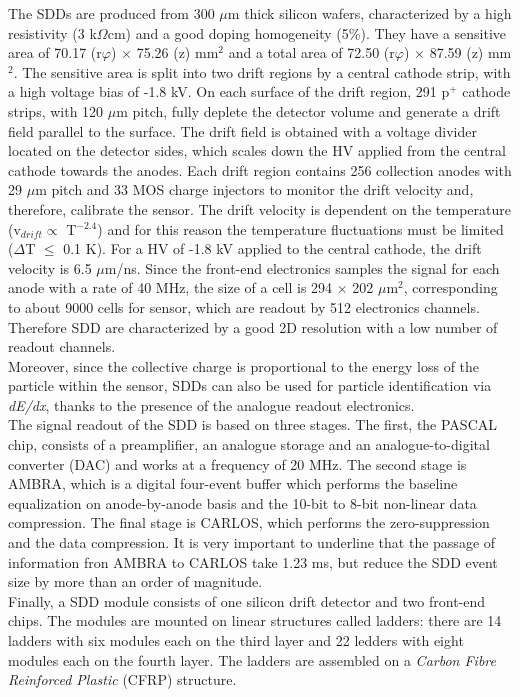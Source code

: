 The SDDs are produced from 300 $\mu$m thick silicon wafers, characterized by a high resistivity (3 k$\Omega$cm) and a good doping homogeneity (5\%). They have a sensitive area of 70.17 (r$\varphi$) $\times$ 75.26 (z) mm$^2$ and a total area of 72.50 (r$\varphi$) $\times$ 87.59 (z) mm$^2$. The sensitive area is split into two drift regions by a central cathode strip, with a high voltage bias of -1.8 kV. On each surface of the drift region, 291 p$^+$ cathode strips, with 120 $\mu$m pitch, fully deplete the detector volume and generate a drift field parallel to the surface. The drift field is obtained with a voltage divider located on the detector sides, which scales down the HV applied from the central cathode towards the anodes. Each drift region contains 256 collection anodes with 29 $\mu$m pitch and 33 MOS charge injectors to monitor the drift velocity and, therefore, calibrate the sensor. The drift velocity is dependent on the temperature (v$_{drift} \propto$ T$^{-2.4}$) and for this reason the temperature fluctuations must be limited ($\Delta$T $\leq$ 0.1 K). For a HV of -1.8 kV applied to the central cathode, the drift velocity is 6.5 $\mu$m/ns. Since the front-end electronics samples the signal for each anode with a rate of 40 MHz, the size of a cell is 294 $\times$ 202 $\mu$m$^2$, corresponding to about 9000 cells for sensor, which are readout by 512 electronics channels. Therefore SDD are characterized by a good 2D resolution with a low number of readout channels.\\
Moreover, since the collective charge is proportional to the energy loss of the particle within the sensor, SDDs can also be used for particle identification via \textit{dE/dx}, thanks to the presence of the analogue readout electronics.\\
The signal readout of the SDD is based on three stages. The first, the PASCAL chip, consists of a preamplifier, an analogue storage and an analogue-to-digital converter (DAC) and works at a frequency of 20 MHz. The second stage is AMBRA, which is a digital four-event buffer which performs the baseline equalization on anode-by-anode basis and the 10-bit to 8-bit non-linear data compression. The final stage is CARLOS, which performs the zero-suppression and the data compression. It is very important to underline that the passage of information fron AMBRA to CARLOS take 1.23 ms, but reduce the SDD event size by more than an order of magnitude.\\
Finally, a SDD module consists of one silicon drift detector and two front-end chips. The modules are mounted on linear structures called ladders: there are 14 ladders with six modules each on the third layer and 22 ledders with eight modules each on the fourth layer. The ladders are assembled on a \textit{Carbon Fibre Reinforced Plastic} (CFRP) structure. 
